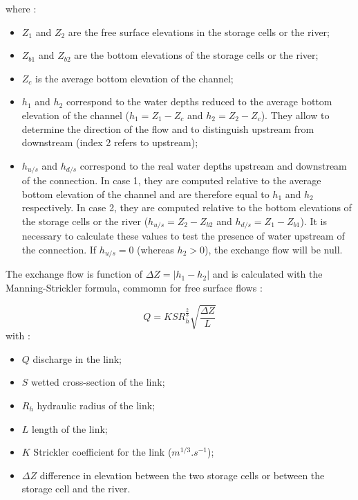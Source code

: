 where :
\begin{itemize}
 \item $Z_1$ and $Z_2$ are the free surface elevations in the storage cells or the river;
 \item $Z_{b1}$ and $Z_{b2}$ are the bottom elevations of the storage cells or the river;
 \item $Z_c$ is the average bottom elevation of the channel;
 \item $h_1$ and $h_2$ correspond to the water depths reduced to the average bottom elevation of the channel ($h_1 = Z_1 - Z_c$ and $h_2 = Z_2 - Z_c$). They allow to determine the direction of the flow and to distinguish upstream from downstream (index 2 refers to upstream);
 \item $h_{u/s}$ and $h_{d/s}$ correspond to the real water depths upstream and downstream of the connection. In case 1, they are computed relative to the average bottom elevation of the channel and are therefore equal to $h_1$ and $h_2$ respectively. In case 2, they are computed relative to the bottom elevations of the storage cells or the river ($h_{u/s} = Z_2 - Z_{b2}$ and $h_{d/s} = Z_1 - Z_{b1}$). It is necessary to calculate these values to test the presence of water upstream of the connection. If $h_{u/s} = 0$ (whereas $h_2 > 0$), the exchange flow will be null.
\end{itemize}

\vspace{0.5cm}

The exchange flow is function of $\Delta Z = |h_1 - h_2|$ and is calculated with the Manning-Strickler formula, commomn for free surface flows :

\begin{equation}
 Q = K S R_{h}^{\frac{2}{3}} \sqrt{\frac{\Delta Z}{L}}
\end{equation}
with :
\begin{itemize}
 \item $Q$ discharge in the link;
 \item $S$ wetted cross-section of the link;
 \item $R_h$ hydraulic radius of the link;
 \item $L$ length of the link;
 \item $K$ Strickler coefficient for the link ($m^{1/3}.s^{-1}$);
 \item $\Delta Z$ difference in elevation between the two storage cells or between the storage cell and the river.
\end{itemize}

